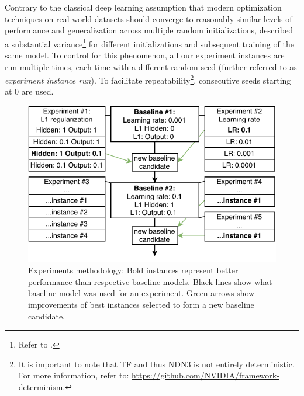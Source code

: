 Contrary to the classical deep learning assumption \citep{2017arXiv170610239W} that modern optimization techniques on real-world datasets should converge to reasonably similar levels of performance and generalization across multiple random initializations, \citeauthor{antolik} described a substantial variance\footnote{Refer to .} for different initializations and subsequent training of the same model. To control for this phenomenon, all our experiment instances are run multiple times, each time with a different random seed (further referred to as \textit{experiment instance run}). To facilitate repeatability\footnote{It is important to note that TF and thus NDN3 is not entirely deterministic. For more information, refer to: \href{https://github.com/NVIDIA/framework-determinism}{https://github.com/NVIDIA/framework-determinism}.}, consecutive seeds starting at 0 are used.

\begin{figure}[ht]
    \centering
    \includegraphics[]{../figures/04_explor_1}
    \caption[Experiments methodology]{Experiments methodology: Bold instances represent better performance than respective baseline models. Black lines show what baseline model was used for an experiment. Green arrows show improvements of best instances selected to form a new baseline candidate.}
    \label{fig:4.1}
\end{figure}

